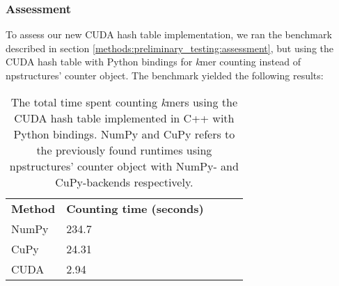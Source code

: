 \subsubsection{Assessment} \label{methods:gpu_accelerating_kmer_counting:assessment}
To assess our new CUDA hash table implementation, we ran the benchmark described in section \ref{methods:preliminary_testing:assessment}, but using the CUDA hash table with Python bindings for \textit{k}mer counting instead of npstructures' counter object.
The benchmark yielded the following results:
\begin{table}[H]
\begin{center}
\begin{tabular}{lllll}
\multicolumn{1}{l|}{\textbf{Method}} & \multicolumn{1}{l}{\textbf{Counting time (seconds)}} &  \\ \cline{1-2}
\multicolumn{1}{l|}{NumPy} & \multicolumn{1}{l}{234.7} &  \\
\multicolumn{1}{l|}{CuPy} & \multicolumn{1}{l}{24.31} &  \\
\multicolumn{1}{l|}{CUDA} & \multicolumn{1}{l}{2.94} &  \\
\end{tabular}
\end{center}
\caption{
  The total time spent counting \textit{k}mers using the CUDA hash table implemented in C++ with Python bindings.
  NumPy and CuPy refers to the previously found runtimes using npstructures' counter object with NumPy- and CuPy-backends respectively.
}
\label{methods:gpu_accelerating_kmer_counting:tables:benchmark}
\end{table}

